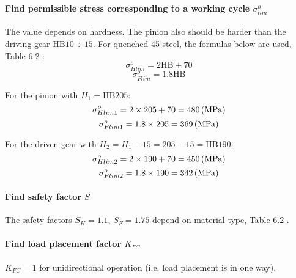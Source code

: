 
\paragraph{Find permissible stress corresponding to a working cycle $ \sigma_{lim}^o $}
The value depends on hardness. The pinion also should be harder than the driving gear $ \text{HB} 10 \div 15 $. For quenched 45 steel, the formulas below are used, Table 6.2 \cite{tk1}:
\[ \sigma_{Hlim}^o = 2\text{HB} + 70\]
\[ \sigma_{Flim}^o = 1.8\text{HB}\]

For the pinion with $ H_1=\text{HB}205$:
\[ \sigma_{Hlim1}^o = 2 \times 205 + 70 = 480 \, (\mathrm{MPa})\]
\[ \sigma_{Flim1}^o = 1.8\times 205 = 369 \, (\mathrm{MPa})\]

For the driven gear with $ H_2=H_1-15=205-15=\text{HB}190 $:
\[ \sigma_{Hlim2}^o = 2 \times 190 + 70 = 450 \, (\mathrm{MPa})\]
\[ \sigma_{Flim2}^o = 1.8\times 190 = 342 \, (\mathrm{MPa})\]

\paragraph{Find safety factor $ S $}
The safety factors $ S_H=1.1 $, $ S_F=1.75 $ depend on material type, Table 6.2 \cite{tk1}.

\paragraph{Find load placement factor $ K_{FC} $}
$ K_{FC} = 1$ for unidirectional operation (i.e. load placement is in one way).

